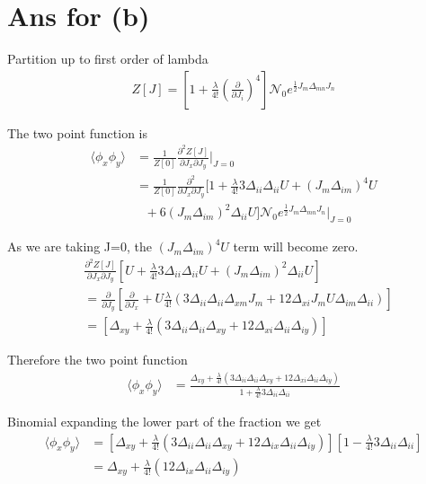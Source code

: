 \documentclass[12pt, letterpaper]{article}
\newcommand*{\1}{\hspace{1pt}}
\begin{document}
    \section*{Ans for (b)}

    Partition up to first order of lambda 
    \begin{align}
        Z[J] = [1 + \frac{\lambda}{4!}(\frac{\partial}{\partial J_{i}})^{4}]\mathcal{N}_{0} e^{\frac{1}{2} J_{m} \Delta _{mn} J_{n}}
    \end{align}


    The two point function is
    \begin{align*}
        \langle \phi_{x}\phi_{y} \rangle & = \frac{1}{Z[0]}\frac{\partial ^2 Z[J]}{\partial J_{x} \partial J_{y}}\Biggr|_{J=0} \\
        & =  \frac{1}{Z[0]}\frac{\partial ^2 }{\partial J_{x} \partial J_{y}}  [1+\frac{\lambda}{4!}3\Delta_{ii}\Delta_{ii}U + (J_{m}\Delta_{im})^{4} U \\
        & \ \ \  + 6(J_{m}\Delta_{im})^{2}\Delta_{ii} U]\mathcal{N}_{0} e^{\frac{1}{2} J_{m} \Delta _{mn} J_{n}}\Biggr|_{J=0}
    \end{align*}

    As we are taking J=0, the  $(J_{m}\Delta_{im})^{4} U$ term will become zero.
    \begin{align*}
         &\frac{\partial ^2 Z[J]}{\partial J_{x} \partial J_{y}}  [U+\frac{\lambda}{4!}3\Delta_{ii}\Delta_{ii}U + (J_{m}\Delta_{im})^{2}\Delta_{ii} U] \\
         & = \frac{\partial }{\partial J_{y}}[\frac{\partial}{\partial J_{x}} + U \frac{\lambda}{4!}(3\Delta_{ii}\Delta_{ii}\Delta_{xm}J_{m} + 12\Delta_{xi}J_{m}U\Delta_{im}\Delta_{ii})] \\ 
         & = [\Delta_{xy} + \frac{\lambda}{4!}(3\Delta_{ii}\Delta_{ii}\Delta_{xy} + 12\Delta_{xi}\Delta_{ii}\Delta_{iy})]
    \end{align*}

    Therefore the two point function
    \begin{align}
        \langle \phi_{x}\phi_{y} \rangle & = \frac{\Delta_{xy} + \frac{\lambda}{4!}(3\Delta_{ii}\Delta_{ii}\Delta_{xy} + 12\Delta_{xi}\Delta_{ii}\Delta_{iy})}{1+\frac{\lambda}{4!} 3\Delta_{ii}\Delta_{ii}}
    \end{align}

    Binomial expanding the lower part of the fraction we get
     \begin{align}
        \langle \phi_{x}\phi_{y} \rangle & = [\Delta_{xy} + \frac{\lambda}{4!}( 3\Delta_{ii}\Delta_{ii}\Delta_{xy} + 12\Delta_{ix}\Delta_{ii}\Delta_{iy})][1-\frac{\lambda}{4!} 3\Delta_{ii}\Delta_{ii}] \\
        & = \Delta_{xy} + \frac{\lambda}{4!}(12\Delta_{ix}\Delta_{ii}\Delta_{iy})
    \end{align}
\end{document}
